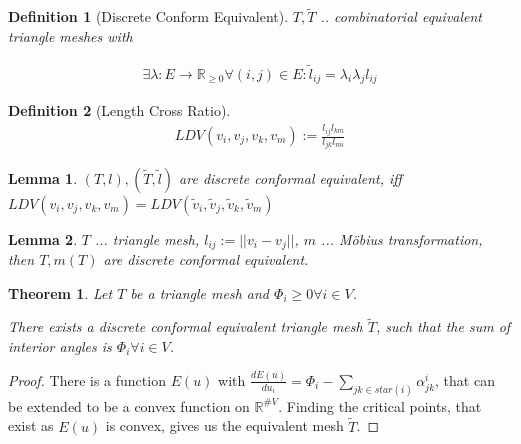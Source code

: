 \documentclass[conference]{IEEEtran}
\newtheorem{definition}{Definition}
\newtheorem{lemma}{Lemma}
\newtheorem{theorem}{Theorem}
\begin{document}
\begin{definition}[Discrete Conform Equivalent]
	
	$T, \tilde{T}$ .. combinatorial equivalent triangle meshes with
	
	\begin{align*}
		\exists \lambda: E \rightarrow \mathbb{R}_{\geq 0} \forall (i,j) \in E: \tilde{l}_{ij} = \lambda_i \lambda_j l_{ij}
	\end{align*}
\end{definition}

\begin{definition}[Length Cross Ratio]
	\begin{align*}
		LDV(v_i, v_j, v_k, v_m) := \frac{l_{ij} l_{km}}{l_{jk} l_{mi}}
	\end{align*}
\end{definition}

\begin{lemma}
	$(T,l), (\tilde{T}, \tilde{l})$ are discrete conformal equivalent, iff $LDV(v_i, v_j, v_k, v_m) = LDV(\tilde{v}_i, \tilde{v}_j, \tilde{v}_k, \tilde{v}_m)$
\end{lemma}

\begin{lemma}
	$T$ ... triangle mesh, $l_{ij} := ||v_i - v_j||$, $m$ ... Möbius transformation, then $T, m(T)$ are discrete conformal equivalent.
\end{lemma}

\begin{theorem}
	Let $T$ be a triangle mesh and $\Phi_i \geq 0 \forall i \in V$.
	
	There exists a discrete conformal equivalent triangle mesh $\tilde{T}$, such that the sum of interior angles is $\Phi_i \forall i \in V$.
\end{theorem}

\begin{proof}
	There is a function $E(u)$ with $\frac{dE(u)}{du_i} = \Phi_i - \sum_{jk \in star(i)} \alpha_{jk}^i$, that can be extended to be a convex function on $\mathbb{R}^{\#V}$. Finding the critical points, that exist as $E(u)$ is convex, gives us the equivalent mesh $\tilde{T}$.
\end{proof}
\end{document}
